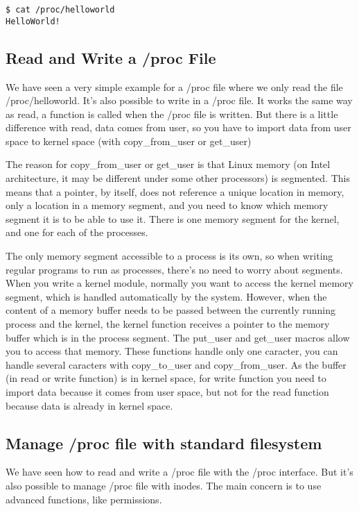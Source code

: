 \documentclass[10pt, oneside]{book}
\begin{document}
\begin{verbatim}
$ cat /proc/helloworld
HelloWorld!
\end{verbatim}


\subsection{Read and Write a /proc File}
\label{sec:org6ba52b3}
We have seen a very simple example for a /proc file where we only read the file /proc/helloworld. It's also possible to write in a /proc file. It works the same way as read, a function is called when the /proc file is written. But there is a little difference with read, data comes from user, so you have to import data from user space to kernel space (with copy\_from\_user or get\_user)

The reason for copy\_from\_user or get\_user is that Linux memory (on Intel architecture, it may be different under some other processors) is segmented. This means that a pointer, by itself, does not reference a unique location in memory, only a location in a memory segment, and you need to know which memory segment it is to be able to use it. There is one memory segment for the kernel, and one for each of the processes.

The only memory segment accessible to a process is its own, so when writing regular programs to run as processes, there's no need to worry about segments. When you write a kernel module, normally you want to access the kernel memory segment, which is handled automatically by the system. However, when the content of a memory buffer needs to be passed between the currently running process and the kernel, the kernel function receives a pointer to the memory buffer which is in the process segment. The put\_user and get\_user macros allow you to access that memory. These functions handle only one caracter, you can handle several caracters with copy\_to\_user and copy\_from\_user. As the buffer (in read or write function) is in kernel space, for write function you need to import data because it comes from user space, but not for the read function because data is already in kernel space.


\subsection{Manage /proc file with standard filesystem}
\label{sec:org3d7029a}
We have seen how to read and write a /proc file with the /proc interface. But it's also possible to manage /proc file with inodes. The main concern is to use advanced functions, like permissions.
\end{document}
